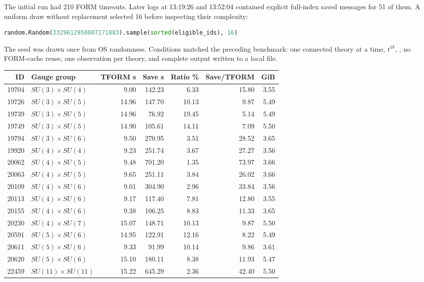 \clearpage
{}
\label{sec:tform-recovered}
The initial run  had 210 FORM
timeouts. Later logs at 13:19:26 and 13:52:04 contained explicit full-index
saved messages for 51 of them. A uniform draw without replacement selected
16 before inspecting their complexity:
\begin{lstlisting}[language=Python]
random.Random(3329612950807171883).sample(sorted(eligible_ids), 16)
\end{lstlisting}
The seed was drawn once from OS randomness. Conditions matched the preceding
benchmark: one connected theory at a time, $t^{18}$, , no FORM-cache
reuse, one observation per theory, and complete output written to a local file.

{\small
\begin{center}
\begin{tabular}{rlrrrrr}
\toprule ID & Gauge group & TFORM s & Save s & Ratio \% & Save/TFORM & GiB\\\midrule
19704 & $SU(3)\times SU(4)$ & 9.00 & 142.23 & 6.33 & 15.80 & 3.55\\
19726 & $SU(3)\times SU(5)$ & 14.96 & 147.70 & 10.13 & 9.87 & 5.49\\
19739 & $SU(3)\times SU(5)$ & 14.96 & 76.92 & 19.45 & 5.14 & 5.49\\
19749 & $SU(3)\times SU(5)$ & 14.90 & 105.61 & 14.11 & 7.09 & 5.50\\
19794 & $SU(3)\times SU(6)$ & 9.50 & 270.95 & 3.51 & 28.52 & 3.65\\
19920 & $SU(4)\times SU(4)$ & 9.23 & 251.74 & 3.67 & 27.27 & 3.56\\
20062 & $SU(4)\times SU(5)$ & 9.48 & 701.20 & 1.35 & 73.97 & 3.66\\
20063 & $SU(4)\times SU(5)$ & 9.65 & 251.11 & 3.84 & 26.02 & 3.66\\
20109 & $SU(4)\times SU(6)$ & 9.01 & 304.90 & 2.96 & 33.84 & 3.56\\
20113 & $SU(4)\times SU(6)$ & 9.17 & 117.40 & 7.81 & 12.80 & 3.55\\
20155 & $SU(4)\times SU(6)$ & 9.38 & 106.25 & 8.83 & 11.33 & 3.65\\
20230 & $SU(4)\times SU(7)$ & 15.07 & 148.71 & 10.13 & 9.87 & 5.50\\
20591 & $SU(5)\times SU(6)$ & 14.95 & 122.91 & 12.16 & 8.22 & 5.49\\
20611 & $SU(5)\times SU(6)$ & 9.33 & 91.99 & 10.14 & 9.86 & 3.61\\
20620 & $SU(5)\times SU(6)$ & 15.10 & 180.11 & 8.38 & 11.93 & 5.47\\
22459 & $SU(11)\times SU(11)$ & 15.22 & 645.29 & 2.36 & 42.40 & 5.50\\
\bottomrule
\end{tabular}
\end{center}}

